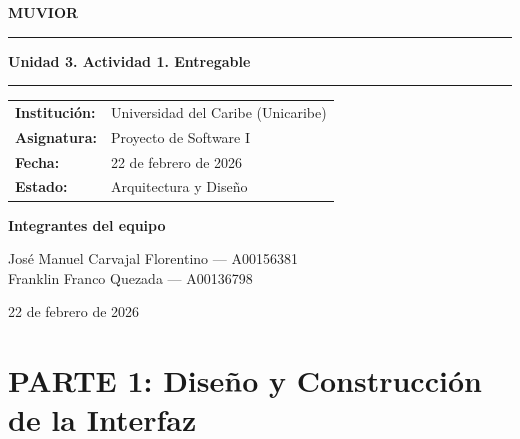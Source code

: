 \documentclass[11pt,a4paper]{article}
\newcommand{\nombreproyecto}{MUVIOR}
\newcommand{\titulodocumento}{Unidad 3. Actividad 1. Entregable}
\begin{document}

\begin{titlepage}
\centering

\vspace*{2.5cm}

{\Huge \textbf{\nombreproyecto}}

\vspace{2.5cm}

\rule{\textwidth}{1.5pt}

\vspace{0.7cm}
{\Huge \textbf{\titulodocumento}}
\vspace{0.7cm}

\rule{\textwidth}{1.5pt}

\vspace{3cm}

\begin{tabularx}{\textwidth}{>{\bfseries}l X}
Institución: & Universidad del Caribe (Unicaribe) \\
Asignatura: & Proyecto de Software I \\
Fecha: & 22 de febrero de 2026 \\
Estado: & Arquitectura y Diseño \\
\end{tabularx}

\vfill

\textbf{Integrantes del equipo}

\vspace{0.5cm}

José Manuel Carvajal Florentino — A00156381 \\
Franklin Franco Quezada — A00136798

\vspace{1.5cm}

22 de febrero de 2026

\end{titlepage}

\newpage


\renewcommand{\contentsname}{Índice de Contenido}
\tableofcontents
\newpage


\section{PARTE 1: Diseño y Construcción de la Interfaz}
\end{document}
